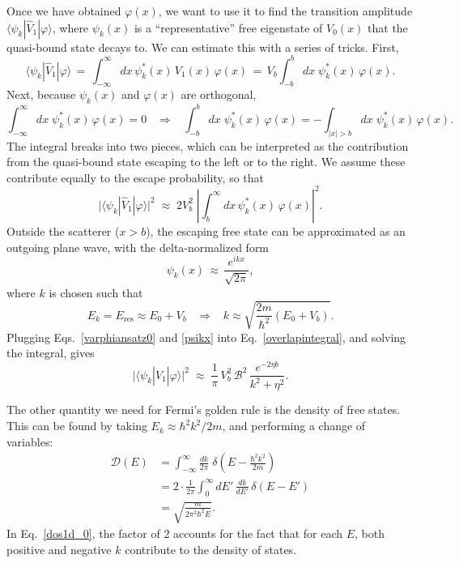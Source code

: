\documentclass[pra,12pt]{revtex4}
\begin{document}
Once we have obtained $\varphi(x)$, we want to use it to find the
transition amplitude $\langle\psi_k|\hat{V}_1|\varphi\rangle$, where
$\psi_k(x)$ is a ``representative'' free eigenstate of $V_0(x)$ that
the quasi-bound state decays to.  We can estimate this with a series
of tricks.  First,
\begin{equation}
  \langle\psi_k|\hat{V}_1|\varphi\rangle \,=\, \int_{-\infty}^\infty dx \, \psi_k^*(x)\, V_1(x)\, \varphi(x) \,=\, V_b \int_{-b}^b dx \; \psi_k^*(x) \,\varphi(x).
\end{equation}
Next, because $\psi_k(x)$ and $\varphi(x)$ are orthogonal,
\begin{equation}
  \int_{-\infty}^\infty dx \; \psi_k^*(x) \,\varphi(x) = 0
  \;\;\;\Rightarrow \;\;\;  
  \int_{-b}^b dx \; \psi_k^*(x) \,\varphi(x) = - \int_{|x| > b} dx \; \psi_k^*(x) \,\varphi(x).
\end{equation}
The integral breaks into two pieces, which can be interpreted as the
contribution from the quasi-bound state escaping to the left or to the
right.  We assume these contribute equally to the escape probability,
so that
\begin{equation}
  \big| \langle\psi_k|\hat{V}_1|\varphi\rangle \big|^2
  \;\approx\; 2 V_b^2 \;
  \left| \int_{b}^\infty dx \, \psi_k^*(x)\, \varphi(x)\right|^2.
  \label{overlapintegral}
\end{equation}
Outside the scatterer ($x > b$), the escaping free state can be
approximated as an outgoing plane wave, with the delta-normalized form
\begin{equation}
  \psi_k(x) \,\approx\, \frac{e^{ikx}}{\sqrt{2\pi}},
  \label{psikx}
\end{equation}
where $k$ is chosen such that
\begin{equation}
  E_k = E_{\mathrm{res}} \approx E_0 + V_b \;\;\;\Rightarrow \;\;\; k \approx \sqrt{\frac{2m}{\hbar^2}(E_0+V_b)}.
\end{equation}
Plugging Eqs.~\eqref{varphiansatz0} and \eqref{psikx} into
Eq.~\eqref{overlapintegral}, and solving the integral, gives
\begin{equation}
  \big| \langle\psi_k|\hat{V}_1|\varphi\rangle \big|^2
  \;\approx \; \frac{1}{\pi}\, V_b^2 \, \mathcal{B}^2\,
  \frac{e^{-2\eta b}}{k^2 + \eta^2}.
  \label{overlap1d}
\end{equation}

The other quantity we need for Fermi's golden rule is the density of
free states.  This can be found by taking $E_k \approx \hbar^2k^2/2m$,
and performing a change of variables:
\begin{align}
  \mathcal{D}(E)
  &= \int_{-\infty}^\infty \frac{dk}{2\pi} \; \delta\left(E-\frac{\hbar^2k^2}{2m}\right) \\
  &= 2 \cdot \frac{1}{2\pi} \int_0^\infty dE' \, \frac{dk}{dE'} \, \delta(E-E') \label{dos1d_0} \\
  &= \sqrt{\frac{m}{2\pi^2\hbar^2 E}}.
  \label{dos1d}
\end{align}
In Eq.~\eqref{dos1d_0}, the factor of 2 accounts for the fact that for
each $E$, both positive and negative $k$ contribute to the density of
states.
\end{document}
